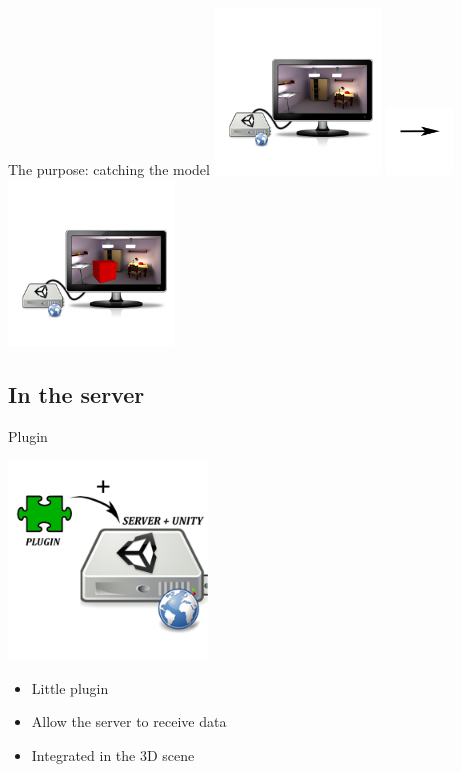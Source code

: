 \documentclass[a4paper,10pt]{beamer}
\begin{document}
			\begin{frame}{The purpose: catching the model}
				\includegraphics[height=125pt]{images/network/scenebefore.png}
				\includegraphics[height=50pt]{images/network/arrow.png}
				\includegraphics[height=125pt]{images/network/scene.png}
			\end{frame}
			
		\subsection{In the server}
			\begin{frame}{Plugin}
				\centerline{\includegraphics[height=150pt]{images/network/plugin.png}}
				\begin{itemize}	
					\item Little plugin
					\item Allow the server to receive data
					\item Integrated in the 3D scene
				\end{itemize}	
											
			\end{frame}
			
\end{document}
